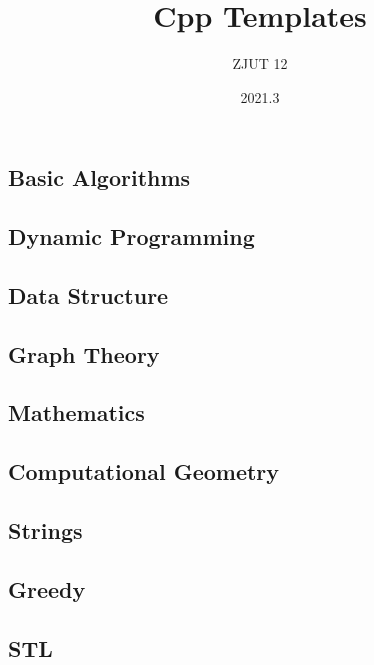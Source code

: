 \documentclass[UTF-8]{article}
\title{\textbf{Cpp Templates}}
\author{ZJUT 12}
\date{2021.3}
\begin{document}
\begin{titlepage}
\maketitle
\end{titlepage}

\tableofcontents
\newpage

\begin{spacing}{2.0}
\section{Basic Algorithms}
\end{spacing}


\begin{spacing}{2.0}
\section{Dynamic Programming}
\end{spacing}


\begin{spacing}{2.0}
\section{Data Structure}
\end{spacing}


\begin{spacing}{2.0}
\section{Graph Theory}
\end{spacing}


\begin{spacing}{2.0}
\section{Mathematics}
\end{spacing}


\begin{spacing}{2.0}
\section{Computational Geometry}
\end{spacing}


\begin{spacing}{2.0}
\section{Strings}
\end{spacing}


\begin{spacing}{2.0}
\section{Greedy}
\end{spacing}


\begin{spacing}{2.0}
\section{STL}
\end{spacing}

\end{document}
